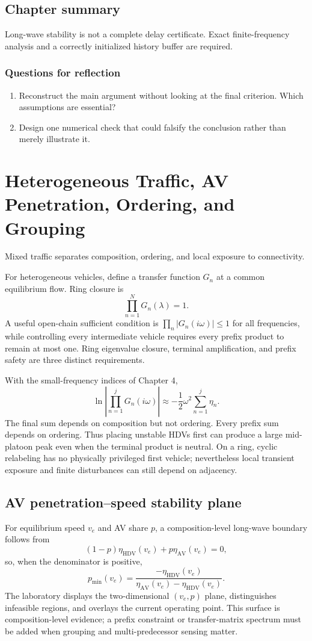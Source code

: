 \documentclass[11pt,a4paper,openany]{book}
\numberwithin{equation}{chapter}
\numberwithin{figure}{chapter}
\numberwithin{table}{chapter}
\newcommand{\chapterguide}[1]{\begin{tcolorbox}[keybox,title=Chapter guide]#1\end{tcolorbox}}
\newcommand{\chapterend}[1]{\section*{Chapter summary}\addcontentsline{toc}{section}{Chapter summary}\begin{tcolorbox}[resultbox]#1\end{tcolorbox}\subsection*{Questions for reflection}\begin{enumerate}[leftmargin=1.7em]\item Reconstruct the main argument without looking at the final criterion. Which assumptions are essential?\item Design one numerical check that could falsify the conclusion rather than merely illustrate it.\end{enumerate}\clearpage}
\begin{document}
\chapterend{Long-wave stability is not a complete delay certificate. Exact finite-frequency analysis and a correctly initialized history buffer are required.}

\chapter{Heterogeneous Traffic, AV Penetration, Ordering, and Grouping}
\chapterguide{Mixed traffic separates composition, ordering, and local exposure to connectivity.}

For heterogeneous vehicles, define a transfer function $G_n$ at a common equilibrium flow. Ring closure is
\begin{equation}
\prod_{n=1}^{N}G_n(\lambda)=1.
\end{equation}
A useful open-chain sufficient condition is $\prod_n|G_n(i\omega)|\le1$ for all frequencies, while controlling every intermediate vehicle requires every prefix product to remain at most one. Ring eigenvalue closure, terminal amplification, and prefix safety are three distinct requirements.

With the small-frequency indices of Chapter 4,
\begin{equation}
\ln\left|\prod_{n=1}^{j}G_n(i\omega)\right|
\approx-\frac12\omega^2\sum_{n=1}^{j}\eta_n.
\end{equation}
The final sum depends on composition but not ordering. Every prefix sum depends on ordering. Thus placing unstable HDVs first can produce a large mid-platoon peak even when the terminal product is neutral. On a ring, cyclic relabeling has no physically privileged first vehicle; nevertheless local transient exposure and finite disturbances can still depend on adjacency.

\section{AV penetration--speed stability plane}
For equilibrium speed $v_e$ and AV share $p$, a composition-level long-wave boundary follows from
\begin{equation}
(1-p)\eta_{\mathrm{HDV}}(v_e)+p\eta_{\mathrm{AV}}(v_e)=0,
\end{equation}
so, when the denominator is positive,
\begin{equation}
p_{\min}(v_e)=
\frac{-\eta_{\mathrm{HDV}}(v_e)}
{\eta_{\mathrm{AV}}(v_e)-\eta_{\mathrm{HDV}}(v_e)}.
\end{equation}
The laboratory displays the two-dimensional $(v_e,p)$ plane, distinguishes infeasible regions, and overlays the current operating point. This surface is composition-level evidence; a prefix constraint or transfer-matrix spectrum must be added when grouping and multi-predecessor sensing matter.
\end{document}
